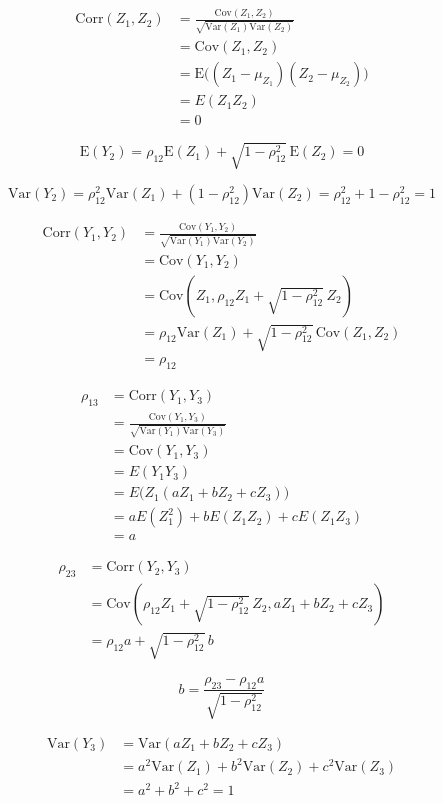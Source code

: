 ﻿\documentclass[12pt]{article}
\begin{document}
\newcommand{\ds}{\displaystyle}


\begin{align*}
\mathrm{Corr}(Z_1,Z_2)
&=\frac{\mathrm{Cov}(Z_1,Z_2)}{\sqrt{\mathrm{Var}(Z_1)\mathrm{Var}(Z_2)}}\\
&=\mathrm{Cov}(Z_1,Z_2)\\
&=\mathrm{E}\big((Z_1-\mu_{Z_1})(Z_2-\mu_{Z_2})\big)\\
&=E(Z_1Z_2)\\
&=0
\end{align*}

$$\mathrm{E}(Y_2)=\rho_{12}\mathrm{E}(Z_1)+\sqrt{1-\rho_{12}^2}\,\mathrm{E}(Z_2)=0$$

$$\mathrm{Var}(Y_2)=\rho_{12}^2\mathrm{Var}(Z_1)+(1-\rho_{12}^2)\mathrm{Var}(Z_2)=\rho_{12}^2+1-\rho_{12}^2=1$$

\begin{align*}
\mathrm{Corr}(Y_1,Y_2)
&=\frac{\mathrm{Cov}(Y_1,Y_2)}{\sqrt{\mathrm{Var}(Y_1)\mathrm{Var}(Y_2)}}\\
&=\mathrm{Cov}(Y_1,Y_2)\\
&=\mathrm{Cov}\left(
Z_1,\rho_{12}Z_1+\sqrt{1-\rho_{12}^2}\,Z_2
\right)\\
&=\rho_{12}\mathrm{Var}(Z_1)
+\sqrt{1-\rho_{12}^2}\,\mathrm{Cov}(Z_1,Z_2)\\
&=\rho_{12}
\end{align*}

\begin{align*}
\rho_{13}
&=\mathrm{Corr}(Y_1,Y_3)\\
&=\frac{\mathrm{Cov}(Y_1,Y_3)}{\sqrt{\mathrm{Var}(Y_1)\mathrm{Var}(Y_3)}}\\
&=\mathrm{Cov}(Y_1,Y_3)\\
&=E(Y_1Y_3)\\
&=E\big(Z_1(aZ_1+bZ_2+cZ_3)\big)\\
&=aE(Z_1^2)+bE(Z_1Z_2)+cE(Z_1Z_3)\\
&=a
\end{align*}


\begin{align*}
\rho_{23}
&=\mathrm{Corr}(Y_2,Y_3)\\
&=\mathrm{Cov}\left(
\rho_{12}Z_1+\sqrt{1-\rho_{12}^2}\,Z_2,
aZ_1+bZ_2+cZ_3
\right)\\
&=\rho_{12}a+\sqrt{1-\rho_{12}^2}\,b
\end{align*}

$$b=\frac{\rho_{23}-\rho_{12}a}
{\sqrt{1-\rho_{12}^2}}$$

\begin{align*}
\mathrm{Var}(Y_3)
&=\mathrm{Var}(aZ_1+bZ_2+cZ_3)\\
&=a^2\mathrm{Var}(Z_1)+b^2\mathrm{Var}(Z_2)+c^2\mathrm{Var}(Z_3)\\
&=a^2+b^2+c^2=1
\end{align*}
\end{document}
